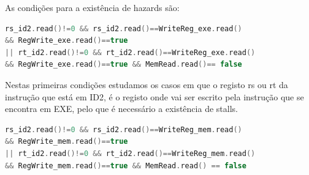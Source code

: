 \documentclass[pdftex,12pt,a4paper]{report}
\begin{document}
As condições para a existência de hazards são:


\begin{lstlisting}[language=c]
rs_id2.read()!=0 && rs_id2.read()==WriteReg_exe.read() 
&& RegWrite_exe.read()==true 
|| rt_id2.read()!=0 && rt_id2.read()==WriteReg_exe.read() 
&& RegWrite_exe.read()==true && MemRead.read()== false
\end{lstlisting} 

\begin{table}[!htb]
\centering
\label{my-label}
\end{table}

Nestas primeiras condições estudamos os casos em que o registo rs ou rt da instrução que está em ID2, é o registo onde vai ser escrito pela instrução que se encontra em EXE, pelo que é necessário a existência de stalls. 

\begin{lstlisting}[language=c]
rs_id2.read()!=0 && rs_id2.read()==WriteReg_mem.read() 
&& RegWrite_mem.read()==true
|| rt_id2.read()!=0 && rt_id2.read()==WriteReg_mem.read() 
&& RegWrite_mem.read()==true && MemRead.read() == false
\end{lstlisting}

\begin{table}[!htb]
\centering
\label{my-label}
\end{table}
\end{document}
